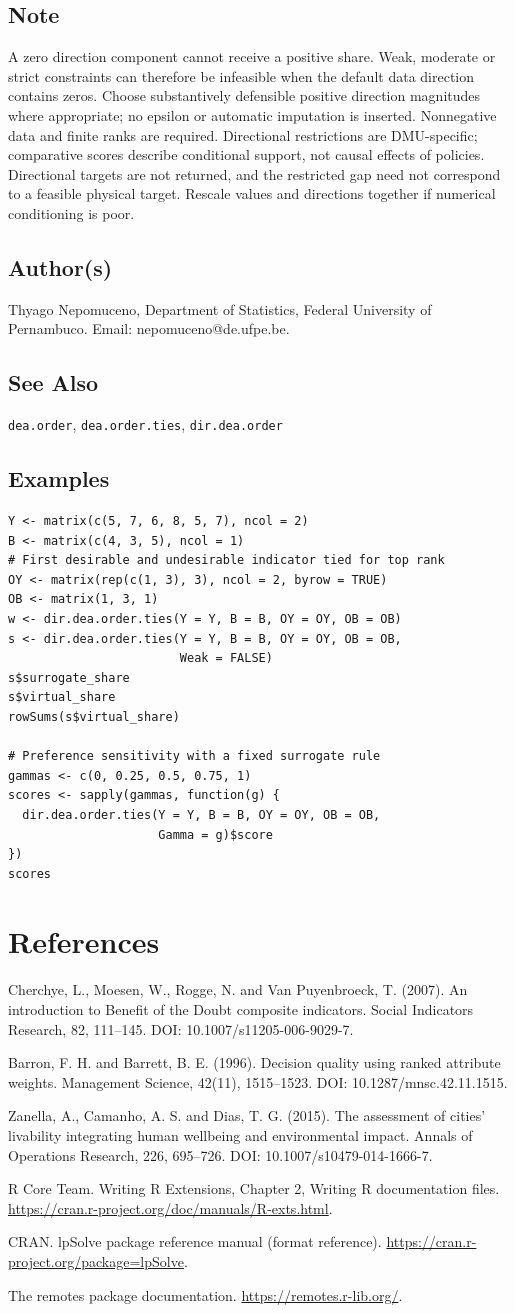 \documentclass[10pt,a4paper]{article}
\newcommand{\field}[1]{\needspace{3\baselineskip}\subsection*{#1}}
\begin{document}
\field{Note}
A zero direction component cannot receive a positive share. Weak, moderate or strict constraints can therefore be infeasible when the default data direction contains zeros. Choose substantively defensible positive direction magnitudes where appropriate; no epsilon or automatic imputation is inserted. Nonnegative data and finite ranks are required. Directional restrictions are DMU-specific; comparative scores describe conditional support, not causal effects of policies. Directional targets are not returned, and the restricted gap need not correspond to a feasible physical target. Rescale values and directions together if numerical conditioning is poor.
\field{Author(s)}
Thyago Nepomuceno, Department of Statistics, Federal University of Pernambuco. Email: nepomuceno@de.ufpe.be.
\field{See Also}
\texttt{dea.order}, \texttt{dea.order.ties}, \texttt{dir.dea.order}
\field{Examples}
\begin{verbatim}
Y <- matrix(c(5, 7, 6, 8, 5, 7), ncol = 2)
B <- matrix(c(4, 3, 5), ncol = 1)
# First desirable and undesirable indicator tied for top rank
OY <- matrix(rep(c(1, 3), 3), ncol = 2, byrow = TRUE)
OB <- matrix(1, 3, 1)
w <- dir.dea.order.ties(Y = Y, B = B, OY = OY, OB = OB)
s <- dir.dea.order.ties(Y = Y, B = B, OY = OY, OB = OB,
                        Weak = FALSE)
s$surrogate_share
s$virtual_share
rowSums(s$virtual_share)

# Preference sensitivity with a fixed surrogate rule
gammas <- c(0, 0.25, 0.5, 0.75, 1)
scores <- sapply(gammas, function(g) {
  dir.dea.order.ties(Y = Y, B = B, OY = OY, OB = OB,
                     Gamma = g)$score
})
scores
\end{verbatim}
\clearpage\section{References}
Cherchye, L., Moesen, W., Rogge, N. and Van Puyenbroeck, T. (2007). An introduction to Benefit of the Doubt composite indicators. Social Indicators Research, 82, 111--145. DOI: 10.1007/s11205-006-9029-7.

Barron, F. H. and Barrett, B. E. (1996). Decision quality using ranked attribute weights. Management Science, 42(11), 1515--1523. DOI: 10.1287/mnsc.42.11.1515.

Zanella, A., Camanho, A. S. and Dias, T. G. (2015). The assessment of cities' livability integrating human wellbeing and environmental impact. Annals of Operations Research, 226, 695--726. DOI: 10.1007/s10479-014-1666-7.

R Core Team. Writing R Extensions, Chapter 2, Writing R documentation files. \url{https://cran.r-project.org/doc/manuals/R-exts.html}.

CRAN. lpSolve package reference manual (format reference). \url{https://cran.r-project.org/package=lpSolve}.

The remotes package documentation. \url{https://remotes.r-lib.org/}.
\clearpage
{}
\printindex
\end{document}
